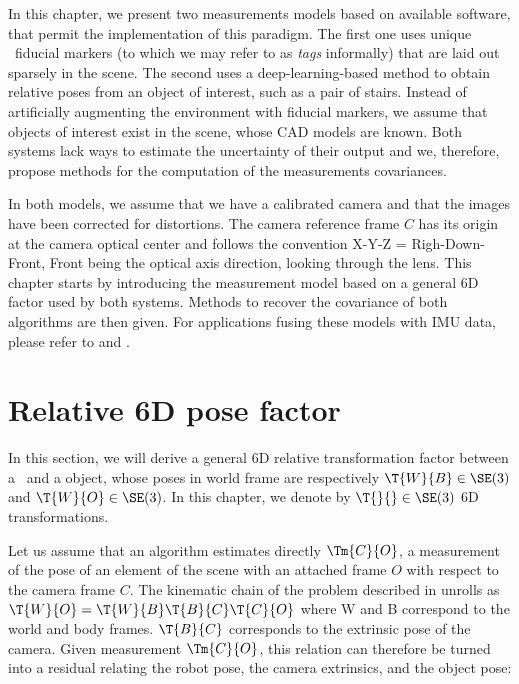 In this chapter, we present two measurements models based on available software, that permit the implementation of this paradigm. The first one 
uses unique \apriltag\ fiducial markers \cite{wang2016iros} (to which we may refer to as \textit{tags} informally) that are laid out sparsely in the scene. 
The second uses a deep-learning-based method \cite{labbe2020cosypose}
to obtain relative poses from an object of interest, such as a pair of stairs. Instead of artificially augmenting the environment with fiducial markers, we assume 
that objects of interest exist in the scene, whose CAD models are known. 
Both systems lack ways to estimate the uncertainty of their output and we, therefore, propose methods for the computation of the measurements covariances.

In both models, we assume that we have a calibrated camera and that the images have been corrected for distortions. The camera reference frame $C$ has its origin at 
the camera optical center and follows the convention X-Y-Z = Righ-Down-Front, Front being the optical axis direction, looking through the lens. This chapter starts by 
introducing the measurement model based on a general 6D factor used by both systems. Methods to recover the covariance of both algorithms are then given. 
For applications fusing these models with IMU data, please refer to  and .



\section{Relative 6D pose factor}
In this section, we will derive a general 6D relative transformation factor between a \keyframe\ and a object, whose poses in world frame are respectively $\T{W}{B} \in \SE(3)$ and $\T{W}{O} \in \SE(3)$. In this chapter, we denote by $\T{}{} \in \SE(3)$ 6D transformations.

Let us assume that an algorithm estimates directly $\Tm{C}{O}$, a measurement of the pose of an element 
of the scene with an attached frame $O$ with respect to the camera frame $C$.
The kinematic chain of the problem described in  unrolls as 
$\T{W}{O} = \T{W}{B}\T{B}{C}\T{C}{O}$ where W and B correspond to the world and body frames. $\T{B}{C}$ corresponds to the extrinsic pose 
of the camera.
Given measurement $\Tm{C}{O}$, this relation can therefore be turned into a residual relating 
the robot pose, the camera extrinsics, and the object pose:

